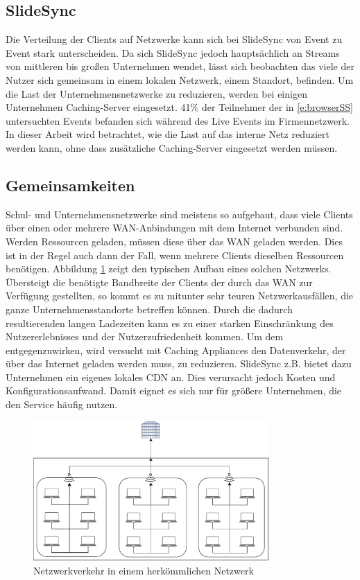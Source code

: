 \subsection{SlideSync}
Die Verteilung der Clients auf Netzwerke kann sich bei SlideSync von Event zu Event stark unterscheiden. Da sich SlideSync jedoch hauptsächlich an Streams von mittleren bis großen Unternehmen wendet, lässt sich beobachten das viele der Nutzer sich gemeinsam in einem lokalen Netzwerk, einem Standort, befinden. Um die Last der Unternehmensnetzwerke zu reduzieren, werden bei einigen Unternehmen Caching-Server eingesetzt. 41\% der Teilnehmer der in \ref{e:browserSS} untersuchten Events befanden sich während des Live Events im Firmennetzwerk. In dieser Arbeit wird betrachtet, wie die Last auf das interne Netz reduziert werden kann, ohne dass zusätzliche Caching-Server eingesetzt werden müssen.

\subsection{Gemeinsamkeiten}

Schul- und Unternehmensnetzwerke sind meistens so aufgebaut, dass viele Clients über einen oder mehrere WAN-Anbindungen mit dem Internet verbunden sind. Werden Ressourcen geladen, müssen diese über das WAN geladen werden. Dies ist in der Regel auch dann der Fall, wenn mehrere Clients dieselben Ressourcen benötigen. Abbildung \ref{fig:school} zeigt den typischen Aufbau eines solchen Netzwerks. Übersteigt die benötigte Bandbreite der Clients der durch das WAN zur Verfügung gestellten, so kommt es zu mitunter sehr teuren Netzwerkausfällen, die ganze Unternehmensstandorte betreffen können. Durch die dadurch resultierenden langen Ladezeiten kann es zu einer starken Einschränkung des Nutzererlebnisses und der Nutzerzufriedenheit kommen.\cite{userWaitingTime} Um dem entgegenzuwirken, wird versucht mit Caching Appliances den Datenverkehr, der über das Internet geladen werden muss, zu reduzieren. SlideSync z.B. bietet dazu Unternehmen ein eigenes lokales CDN an. Dies verursacht jedoch Kosten und Konfigurationsaufwand. Damit eignet es sich nur für größere Unternehmen, die den Service häufig nutzen.

\begin{figure}[!h]
	\centering
	\includegraphics[width=0.8\textwidth]{figures/network_current}
	\caption[A Figure Short-Title]{Netzwerkverkehr in einem herkömmlichen Netzwerk}
	\label{fig:school}
\end{figure}

